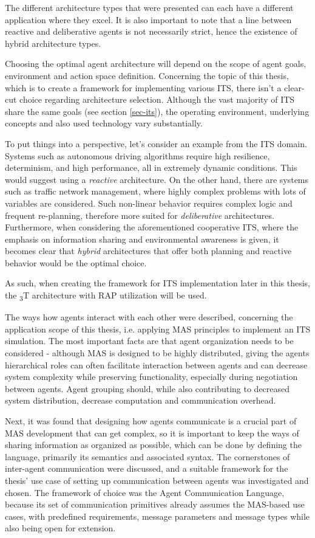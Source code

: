 \documentclass[0main.tex]{subfiles}
\begin{document}
The different architecture types that were presented can each have a different application where 
they excel. It is also important to note that a line between reactive and deliberative agents 
is not necessarily strict, hence the existence of hybrid architecture types. 

Choosing the optimal agent architecture will depend on the scope of agent goals, 
environment and action space definition. Concerning the topic of this thesis, which is to 
create a framework for implementing various ITS, there isn't a clear-cut choice regarding 
architecture selection. Although the vast majority of ITS share the same goals (see section \ref{sec-its}), 
the operating environment, underlying concepts and also used technology vary substantially.

To put things into a perspective, let's consider an example from the ITS domain. 
Systems such as autonomous driving algorithms require high resilience, determinism, 
and high performance, all in extremely dynamic conditions. This would suggest using a
\emph{reactive} architecture. On the other hand, there are systems such as traffic network management, 
where highly complex problems with lots of variables are considered. Such non-linear behavior 
requires complex logic and frequent re-planning, therefore more suited for \emph{deliberative}
architectures. Furthermore, when considering the aforementioned cooperative ITS, where the emphasis 
on information sharing and environmental awareness is given, it becomes clear that \emph{hybrid} 
architectures that offer both planning and reactive behavior would be the optimal choice.

As such, when creating the framework for ITS implementation later in this thesis, the
\textsubscript{3}T architecture with RAP utilization will be used.  

The ways how agents interact with each other were described, concerning the
application scope of this thesis, i.e. applying MAS principles to implement an ITS simulation. The most important
facts are that agent organization needs to be considered - although MAS is
designed to be highly distributed, giving the agents hierarchical roles can often facilitate
interaction between agents and can decrease system complexity while preserving functionality,
especially during negotiation between agents. Agent grouping should, while also contributing to
decreased system distribution, decrease computation and communication overhead. 

Next, it was found that designing how agents communicate is a crucial part of MAS development
that can get complex, so it is important to keep the ways of sharing information as organized
as possible, which can be done by defining the language, primarily its semantics and associated
syntax.  The cornerstones of inter-agent communication were discussed, and a suitable framework
for the thesis' use case of setting up communication between agents was investigated and
chosen. The framework of choice was the Agent Communication Language, because its set of
communication primitives already assumes the MAS-based use cases, with predefined requirements,
message parameters and message types while also being open for extension.
\end{document}
